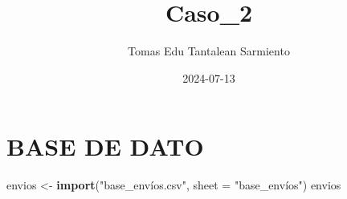 \documentclass[
]{article}
\title{Caso\_2}
\author{Tomas Edu Tantalean Sarmiento}
\date{2024-07-13}
\newenvironment{Shaded}{\begin{snugshade}}{\end{snugshade}}
\newcommand{\AttributeTok}[1]{\textcolor[rgb]{0.13,0.29,0.53}{#1}}
\newcommand{\FunctionTok}[1]{\textcolor[rgb]{0.13,0.29,0.53}{\textbf{#1}}}
\newcommand{\NormalTok}[1]{#1}
\newcommand{\OtherTok}[1]{\textcolor[rgb]{0.56,0.35,0.01}{#1}}
\newcommand{\StringTok}[1]{\textcolor[rgb]{0.31,0.60,0.02}{#1}}
\begin{document}
\maketitle

\hypertarget{base-de-dato}{%
\section{BASE DE DATO}\label{base-de-dato}}

\begin{Shaded}
\begin{Highlighting}[]
\NormalTok{envios }\OtherTok{\textless{}{-}} \FunctionTok{import}\NormalTok{(}\StringTok{"base\_envíos.csv"}\NormalTok{, }\AttributeTok{sheet =} \StringTok{"base\_envíos"}\NormalTok{)}
\NormalTok{envios}
\end{Highlighting}
\end{Shaded}
\end{document}
